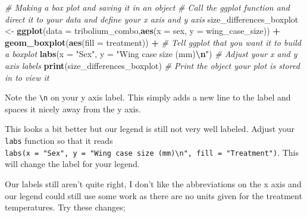 \documentclass[
]{book}
\newenvironment{Shaded}{\begin{snugshade}}{\end{snugshade}}
\newcommand{\AttributeTok}[1]{\textcolor[rgb]{0.13,0.29,0.53}{#1}}
\newcommand{\CommentTok}[1]{\textcolor[rgb]{0.56,0.35,0.01}{\textit{#1}}}
\newcommand{\FunctionTok}[1]{\textcolor[rgb]{0.13,0.29,0.53}{\textbf{#1}}}
\newcommand{\NormalTok}[1]{#1}
\newcommand{\OtherTok}[1]{\textcolor[rgb]{0.56,0.35,0.01}{#1}}
\newcommand{\SpecialCharTok}[1]{\textcolor[rgb]{0.81,0.36,0.00}{\textbf{#1}}}
\newcommand{\StringTok}[1]{\textcolor[rgb]{0.31,0.60,0.02}{#1}}
\begin{document}
\begin{Shaded}
\begin{Highlighting}[]
\CommentTok{\# Making a box plot and saving it in an object}
\CommentTok{\# Call the ggplot function and direct it to your data and define your x axis and y axis}
\NormalTok{size\_differences\_boxplot }\OtherTok{\textless{}{-}} \FunctionTok{ggplot}\NormalTok{(}\AttributeTok{data =}\NormalTok{ tribolium\_combo,}\FunctionTok{aes}\NormalTok{(}\AttributeTok{x =}\NormalTok{ sex, }\AttributeTok{y =}\NormalTok{ wing\_case\_size)) }\SpecialCharTok{+} 
  \FunctionTok{geom\_boxplot}\NormalTok{(}\FunctionTok{aes}\NormalTok{(}\AttributeTok{fill =}\NormalTok{ treatment)) }\SpecialCharTok{+} \CommentTok{\# Tell ggplot that you want it to build a boxplot}
  \FunctionTok{labs}\NormalTok{(}\AttributeTok{x =} \StringTok{"Sex"}\NormalTok{, }\AttributeTok{y =} \StringTok{"Wing case size (mm)}\SpecialCharTok{\textbackslash{}n}\StringTok{"}\NormalTok{) }\CommentTok{\# Adjust your x and y axis labels }
\FunctionTok{print}\NormalTok{(size\_differences\_boxplot) }\CommentTok{\# Print the object your plot is stored in to view it}
\end{Highlighting}
\end{Shaded}

Note the \texttt{\textbackslash{}n} on your y axis label. This simply adds a new line to the label and spaces it nicely away from the y axis.

This looks a bit better but our legend is still not very well labeled. Adjust your \texttt{labs} function so that it reads \texttt{labs(x\ =\ "Sex",\ y\ =\ "Wing\ case\ size\ (mm)\textbackslash{}n",\ fill\ =\ "Treatment")}. This will change the label for your legend.

Our labels still aren't quite right, I don't like the abbreviations on the x axis and our legend could still use some work as there are no units given for the treatment temperatures. Try these changes;
\end{document}
